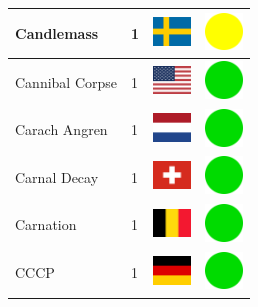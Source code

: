 \documentclass[12pt, a4paper, twoside]{report}
\begin{document}
\begin{center}
\begin{longtable}{|p{5cm}|p{2cm}|p{2cm}|p{2cm}|}
			Candlemass & 1 & \includegraphics[width=1cm]{4x3/se} & \includegraphics[width=1cm]{likes/m} \\ \hline
			Cannibal Corpse & 1 & \includegraphics[width=1cm]{4x3/us} & \includegraphics[width=1cm]{likes/y} \\ \hline
			Carach Angren & 1 & \includegraphics[width=1cm]{4x3/nl} & \includegraphics[width=1cm]{likes/y} \\ \hline
			Carnal Decay & 1 & \includegraphics[width=1cm]{4x3/ch} & \includegraphics[width=1cm]{likes/y} \\ \hline
			Carnation & 1 & \includegraphics[width=1cm]{4x3/be} & \includegraphics[width=1cm]{likes/y} \\ \hline
			CCCP & 1 & \includegraphics[width=1cm]{4x3/de} & \includegraphics[width=1cm]{likes/y} \\ \hline

\end{longtable}
\end{center}
\end{document}
